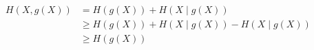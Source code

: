 \documentclass{article}[12pt]
\numberwithin{equation}{subsection}
\begin{document}
\begin{flushleft}
\begin{align*}
H \left( X, g \left( X \right) \right) &= H \left( g \left( X \right) \right) + H \left( X \mid g \left( X \right) \right) \\
&\geq H \left( g \left( X \right) \right) + H \left( X \mid g \left( X \right) \right) - H \left( X \mid g \left( X \right)\right) \\
&\geq H \left( g \left( X \right) \right)
\end{align*}











































































































\end{flushleft}
\end{document}
